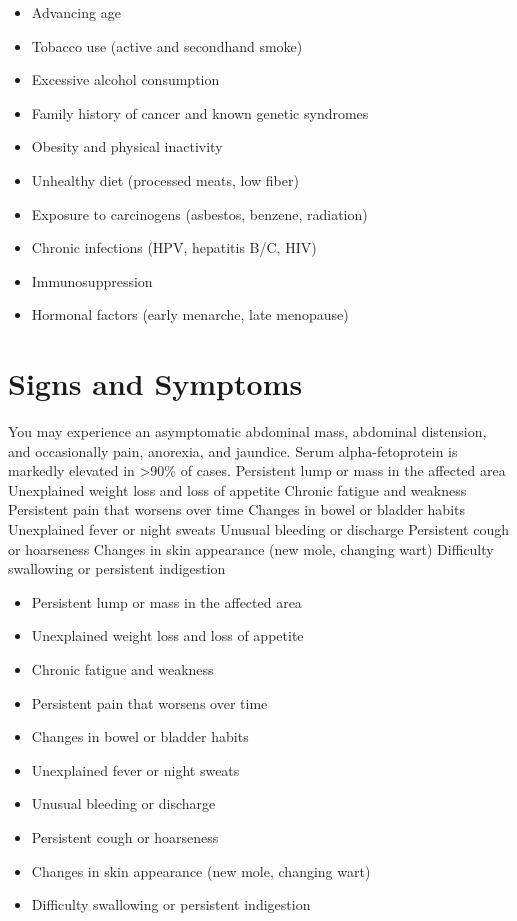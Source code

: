 \begin{itemize}[noitemsep]
  \item Advancing age
  \item Tobacco use (active and secondhand smoke)
  \item Excessive alcohol consumption
  \item Family history of cancer and known genetic syndromes
  \item Obesity and physical inactivity
  \item Unhealthy diet (processed meats, low fiber)
  \item Exposure to carcinogens (asbestos, benzene, radiation)
  \item Chronic infections (HPV, hepatitis B/C, HIV)
  \item Immunosuppression
  \item Hormonal factors (early menarche, late menopause)
\end{itemize}
\section{Signs and Symptoms}
You may experience an asymptomatic abdominal mass, abdominal distension, and occasionally pain, anorexia, and jaundice. Serum alpha-fetoprotein is markedly elevated in >90\% of cases. Persistent lump or mass in the affected area Unexplained weight loss and loss of appetite Chronic fatigue and weakness Persistent pain that worsens over time Changes in bowel or bladder habits Unexplained fever or night sweats Unusual bleeding or discharge Persistent cough or hoarseness Changes in skin appearance (new mole, changing wart) Difficulty swallowing or persistent indigestion

\begin{itemize}[noitemsep]
  \item Persistent lump or mass in the affected area
  \item Unexplained weight loss and loss of appetite
  \item Chronic fatigue and weakness
  \item Persistent pain that worsens over time
  \item Changes in bowel or bladder habits
  \item Unexplained fever or night sweats
  \item Unusual bleeding or discharge
  \item Persistent cough or hoarseness
  \item Changes in skin appearance (new mole, changing wart)
  \item Difficulty swallowing or persistent indigestion
\end{itemize}
